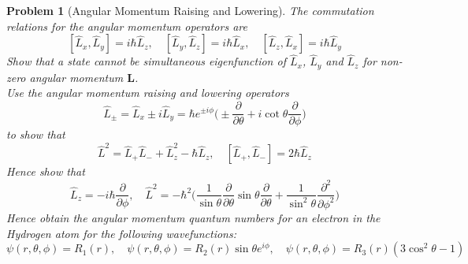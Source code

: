 \documentclass[a4paper]{article}
\theoremstyle{new}
\newtheorem{qns}{Problem}[section]
\begin{document}
\newpage
\begin{qns}[Angular Momentum Raising and Lowering]
The commutation relations for the angular momentum operators are
$$[\hat{L}_x,\hat{L}_y]=i\hbar\hat{L}_z,\quad [\hat{L}_y,\hat{L}_z]=i\hbar\hat{L}_x,\quad [\hat{L}_z,\hat{L}_x]=i\hbar\hat{L}_y$$
Show that a state cannot be simultaneous eigenfunction of $\hat{L}_x$, $\hat{L}_y$ and $\hat{L}_z$ for non-zero angular momentum $\mathbf{L}$.\\[5pt]
Use the angular momentum raising and lowering operators
$$\hat{L}_\pm=\hat{L}_x\pm i\hat{L}_y=\hbar e^{\pm i\phi}\bigg(\pm\frac{\partial}{\partial\theta}+i\cot\theta\frac{\partial}{\partial\phi}\bigg)$$
to show that
$$\hat{L}^2=\hat{L}_+\hat{L}_-+\hat{L}^2_z-\hbar\hat{L}_z,\quad [\hat{L}_+,\hat{L}_-]=2\hbar\hat{L}_z$$
Hence show that
$$\hat{L}_z=-i\hbar\frac{\partial}{\partial\phi},\quad\hat{L}^2=-\hbar^2\bigg(\frac{1}{\sin\theta}\frac{\partial}{\partial\theta}\sin\theta\frac{\partial}{\partial\theta}+\frac{1}{\sin^2\theta}\frac{\partial^2}{\partial\phi^2}\bigg)$$
Hence obtain the angular momentum quantum numbers for an electron in the Hydrogen atom for the following wavefunctions:
$$\psi(r,\theta,\phi)=R_1(r),\quad\psi(r,\theta,\phi)=R_2(r)\sin\theta e^{i\phi},\quad \psi(r,\theta,\phi)=R_3(r)(3\cos^2\theta-1)$$
\end{qns}
\end{document}
